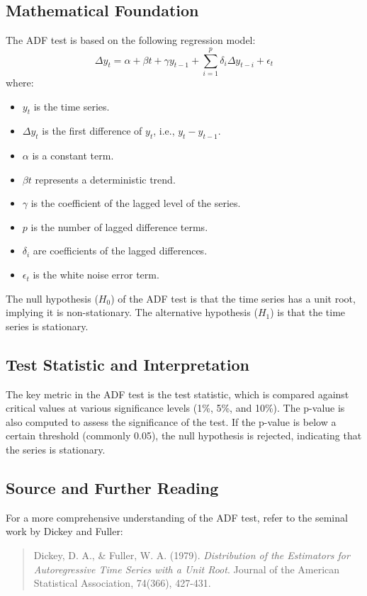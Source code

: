 \documentclass{article}
\begin{document}
\subsection*{Mathematical Foundation}
The ADF test is based on the following regression model:
\[
\Delta y_t = \alpha + \beta t + \gamma y_{t-1} + \sum_{i=1}^p \delta_i \Delta y_{t-i} + \epsilon_t
\]
where:
\begin{itemize}
    \item \( y_t \) is the time series.
    \item \( \Delta y_t \) is the first difference of \( y_t \), i.e., \( y_t - y_{t-1} \).
    \item \( \alpha \) is a constant term.
    \item \( \beta t \) represents a deterministic trend.
    \item \( \gamma \) is the coefficient of the lagged level of the series.
    \item \( p \) is the number of lagged difference terms.
    \item \( \delta_i \) are coefficients of the lagged differences.
    \item \( \epsilon_t \) is the white noise error term.
\end{itemize}

The null hypothesis (\(H_0\)) of the ADF test is that the time series has a unit root, implying it is non-stationary. The alternative hypothesis (\(H_1\)) is that the time series is stationary.

\subsection*{Test Statistic and Interpretation}
The key metric in the ADF test is the test statistic, which is compared against critical values at various significance levels (1\%, 5\%, and 10\%). The p-value is also computed to assess the significance of the test. If the p-value is below a certain threshold (commonly 0.05), the null hypothesis is rejected, indicating that the series is stationary.

\subsection*{Source and Further Reading}
For a more comprehensive understanding of the ADF test, refer to the seminal work by Dickey and Fuller:
\begin{quote}
Dickey, D. A., \& Fuller, W. A. (1979). \textit{Distribution of the Estimators for Autoregressive Time Series with a Unit Root}. Journal of the American Statistical Association, 74(366), 427-431.
\end{quote}
\end{document}
